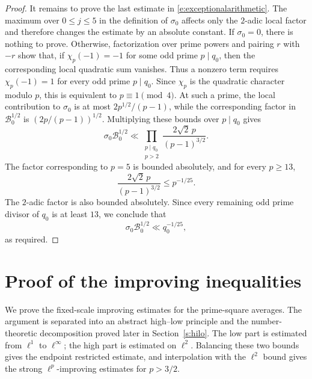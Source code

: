 \documentclass[12pt,reqno]{amsart}
\numberwithin{equation}{section}
\theoremstyle{definition}
\theoremstyle{remark}
\begin{document}
\begin{proof}
It remains to prove the last estimate in
\eqref{e:exceptionalarithmetic}.  The maximum over
\(0\leq j\leq5\) in the definition of \(\sigma_0\) affects only the
\(2\)-adic local factor and therefore changes the estimate by an
absolute constant.  If \(\sigma_0=0\), there is nothing to prove.
Otherwise, factorization over prime powers and pairing \(r\) with
\(-r\) show that, if \(\chi_p(-1)=-1\) for some odd prime
\(p\mid q_0\), then the corresponding local quadratic sum vanishes.
Thus a nonzero term requires $\chi_p(-1)=1$ for every odd prime $p\mid q_0$.
Since \(\chi_p\) is the quadratic character modulo \(p\), this is
equivalent to \(p\equiv1\pmod4\).
At such a prime, the local contribution to \(\sigma_0\) is at most
\(2p^{1/2}/(p-1)\), while the corresponding factor in
\(\mathcal B_0^{1/2}\) is \((2p/(p-1))^{1/2}\).  Multiplying these bounds
over \(p\mid q_0\) gives
\[
 \sigma_0\mathcal B_0^{1/2}
 \ll
 \prod_{\substack{p\mid q_0\\p>2}}
 \frac{2\sqrt2\,p}{(p-1)^{3/2}}.
\]
The factor corresponding to \(p=5\) is bounded absolutely, and for every
\(p\geq13\),
\[
 \frac{2\sqrt2\,p}{(p-1)^{3/2}}\leq p^{-1/25}.
\]
The \(2\)-adic factor is also bounded absolutely.  Since every remaining
odd prime divisor of \(q_0\) is at least \(13\), we conclude that
\[
 \sigma_0\mathcal B_0^{1/2}\ll q_0^{-1/25},
\]
as required.
\end{proof}

\section{Proof of the improving inequalities}
\label{s:improving}



We prove the fixed-scale improving estimates for the prime-square averages.
The argument is separated into an abstract high--low principle and the
number-theoretic decomposition proved later in Section~\ref{s:hilo}.
The low part is estimated from \(\ell^1\) to \(\ell^\infty\);
the high part is estimated on \(\ell^2\).  Balancing these two
bounds gives the endpoint restricted estimate, and interpolation with the
\(\ell^2\) bound gives the strong \(\ell^p\)-improving estimates for
\(p>3/2\).

\end{document}
